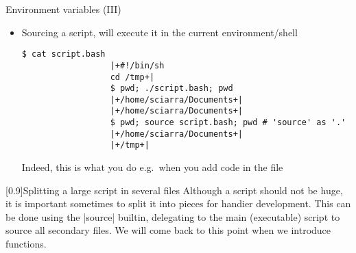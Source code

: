 \begin{frame}[fragile]{Environment variables (III)}
    \vspace{-3mm}
    \begin{itemize}
        \item Sourcing a script, will execute it in the current environment/shell
              \begin{lstlisting}[style=MyBash, numbers=none, aboveskip=2mm, belowskip=-6mm, xrightmargin=20mm]
                  $ cat script.bash
                  |+#!/bin/sh
                  cd /tmp+|
                  $ pwd; ./script.bash; pwd
                  |+/home/sciarra/Documents+|
                  |+/home/sciarra/Documents+|
                  $ pwd; source script.bash; pwd # 'source' as '.'
                  |+/home/sciarra/Documents+|
                  |+/tmp+|
              \end{lstlisting}
              Indeed, this is what you do e.g.\ when you add code in the  file
    \end{itemize}
    \begin{varblock}{}[0.9\textwidth]{Splitting a large script in several files}
        Although a script should not be huge, it is important sometimes to split it into pieces for handier development.
        This can be done using the \bash|source| builtin, delegating to the main (executable) script to source all secondary files.
        We will come back to this point when we introduce functions.
    \end{varblock}
\end{frame}



